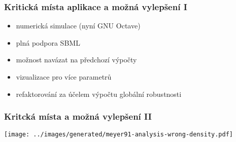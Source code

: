 \documentclass[xcolor=svgnames]{beamer}
\begin{document}
\begin{frame}
	\frametitle{Kritická místa aplikace a možná vylepšení I}

	\begin{itemize}
		\item	numerická simulace (nyní GNU Octave)
		\item	plná podpora SBML
		\item	možnost navázat na předchozí výpočty
		\item	vizualizace pro více parametrů
		\item	refaktorování za účelem výpočtu globální robustnosti
	\end{itemize}
\end{frame}
\begin{frame}
	\frametitle{Kritcká místa a možná vylepšení II}
	\begin{center}
		\texttt{[image: ../images/generated/meyer91-analysis-wrong-density.pdf]}
	\end{center}
\end{frame}
\end{document}

